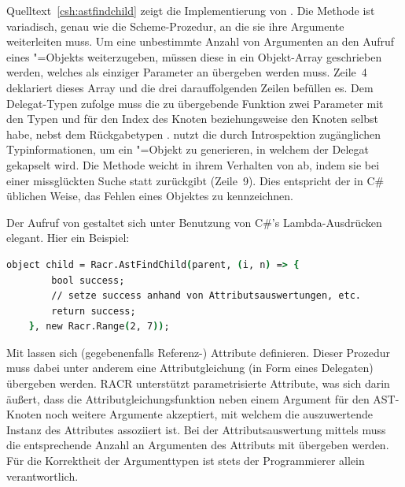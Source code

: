 Quelltext~\ref{csh:astfindchild} zeigt die Implementierung von . Die Methode ist variadisch, genau wie die Scheme-Prozedur, an die sie ihre Argumente weiterleiten muss. Um eine unbestimmte Anzahl von Argumenten an den Aufruf eines "=Objekts weiterzugeben, müssen diese in ein Objekt-Array geschrieben werden, welches als einziger Parameter an  übergeben werden muss. Zeile~4 deklariert dieses Array und die drei darauffolgenden Zeilen befüllen es. Dem Delegat-Typen  zufolge muss die zu übergebende Funktion zwei Parameter mit den Typen  und  für den Index des Knoten beziehungsweise den Knoten selbst habe, nebst dem Rückgabetypen .  nutzt die durch Introspektion zugänglichen Typinformationen, um ein "=Objekt zu generieren, in welchem der Delegat gekapselt wird. Die Methode  weicht in ihrem Verhalten von  ab, indem sie bei einer missglückten Suche statt   zurückgibt (Zeile~9). Dies entspricht der in C\# üblichen Weise, das Fehlen eines Objektes zu kennzeichnen.

Der Aufruf von  gestaltet sich unter Benutzung von C\#'s Lambda-Ausdrücken elegant. Hier ein Beispiel:

\begin{lstlisting}[language=csh]
object child = Racr.AstFindChild(parent, (i, n) => {
		bool success;
		// setze success anhand von Attributsauswertungen, etc.
		return success;
	}, new Racr.Range(2, 7));
\end{lstlisting}

Mit  lassen sich (gegebenenfalls Referenz-) Attribute definieren. Dieser Prozedur muss dabei unter anderem eine Attributgleichung (in Form eines Delegaten) übergeben werden. RACR unterstützt parametrisierte Attribute, was sich darin äußert, dass die Attributgleichungsfunktion neben einem Argument für den AST-Knoten noch weitere Argumente akzeptiert, mit welchem die auszuwertende Instanz des Attributes assoziiert ist. Bei der Attributsauswertung mittels  muss die entsprechende Anzahl an Argumenten des Attributs mit übergeben werden. Für die Korrektheit der Argumenttypen ist stets der Programmierer allein verantwortlich.

